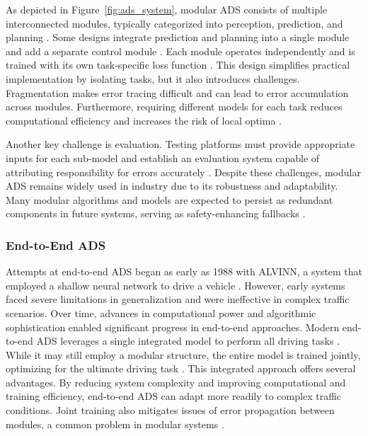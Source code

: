 As depicted in Figure~\ref{fig:ads_system}, modular ADS consists of multiple interconnected modules, typically categorized into perception, prediction, and planning \citep{mozaffari2020deep,kiran2021deep}. Some designs integrate prediction and planning into a single module and add a separate control module \citep{zhu2021survey}. Each module operates independently and is trained with its own task-specific loss function \citep{grigorescu2020survey}. This design simplifies practical implementation by isolating tasks, but it also introduces challenges. Fragmentation makes error tracing difficult and can lead to error accumulation across modules. Furthermore, requiring different models for each task reduces computational efficiency and increases the risk of local optima \citep{chib2023recent}.

Another key challenge is evaluation. Testing platforms must provide appropriate inputs for each sub-model and establish an evaluation system capable of attributing responsibility for errors accurately \citep{chao2020survey}. Despite these challenges, modular ADS remains widely used in industry due to its robustness and adaptability. Many modular algorithms and models are expected to persist as redundant components in future systems, serving as safety-enhancing fallbacks \citep{yurtsever2020survey}.

\subsubsection{End-to-End ADS}


Attempts at end-to-end ADS began as early as 1988 with ALVINN, a system that employed a shallow neural network to drive a vehicle \citep{pomerleau1988alvinn}. However, early systems faced severe limitations in generalization and were ineffective in complex traffic scenarios. Over time, advances in computational power and algorithmic sophistication enabled significant progress in end-to-end approaches. Modern end-to-end ADS leverages a single integrated model to perform all driving tasks \citep{zeng2019end,tampuu2020survey,chitta2021neat}. While it may still employ a modular structure, the entire model is trained jointly, optimizing for the ultimate driving task \citep{le2022survey}. This integrated approach offers several advantages. By reducing system complexity and improving computational and training efficiency, end-to-end ADS can adapt more readily to complex traffic conditions\citep{hu2023planning}. Joint training also mitigates issues of error propagation between modules, a common problem in modular systems \citep{casas2021mp3,chib2023recent}.

